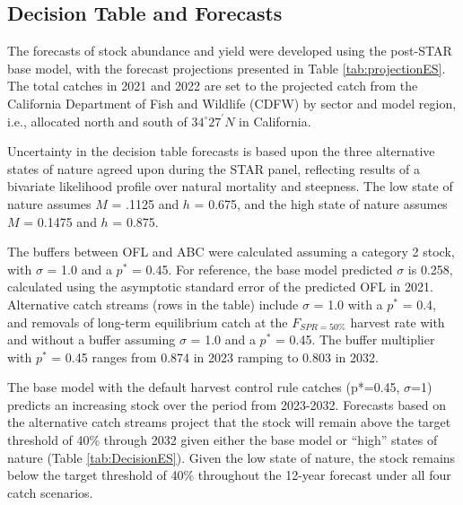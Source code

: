 \documentclass[
  english,
  a4paper,
]{article}
\begin{document}
\FloatBarrier

\hypertarget{decision-table-and-forecasts}{%
\subsection*{Decision Table and Forecasts}\label{decision-table-and-forecasts}}

The forecasts of stock abundance and yield were developed using the post-STAR
base model, with the forecast projections presented in
Table \ref{tab:projectionES}. The total catches in 2021 and 2022 are set to
the projected catch from the California Department of Fish and Wildlife (CDFW) by
sector and model region, i.e., allocated north and south of $34^\circ 27^\prime N$ in California.

Uncertainty in the decision table forecasts is based upon the three alternative states of nature agreed upon during the STAR panel, reflecting results of a bivariate likelihood profile over natural mortality and steepness. The low state of nature assumes \(M\) = .1125 and \(h\) = 0.675, and the high state of nature assumes \(M\) = 0.1475 and \(h\) = 0.875.

The buffers between OFL and ABC were calculated assuming a category 2 stock, with \(\sigma\) = 1.0
and a \(p^*\) = 0.45. For reference, the base model predicted \(\sigma\) is 0.258, calculated using the asymptotic standard error of the predicted OFL in 2021. Alternative catch streams (rows in the table) include \(\sigma\) = 1.0
with a \(p^*\) = 0.4, and removals of long-term equilibrium catch at the \(F_{SPR=50\%}\) harvest rate with and without a buffer assuming \(\sigma\) = 1.0 and a \(p^*\) = 0.45. The buffer multiplier with \(p^*\) = 0.45 ranges from 0.874 in 2023 ramping to 0.803 in 2032.

The base
model with the default harvest control rule catches (p*=0.45, \(\sigma\)=1) predicts an increasing stock over the period from
2023-2032. Forecasts based on the alternative catch streams project that
the stock will remain above the target threshold of 40\% through 2032 given either the base model or ``high'' states of nature (Table \ref{tab:DecisionES}). Given the low state of nature, the stock remains below the target threshold of 40\% throughout the 12-year forecast under all four catch scenarios.
\end{document}
